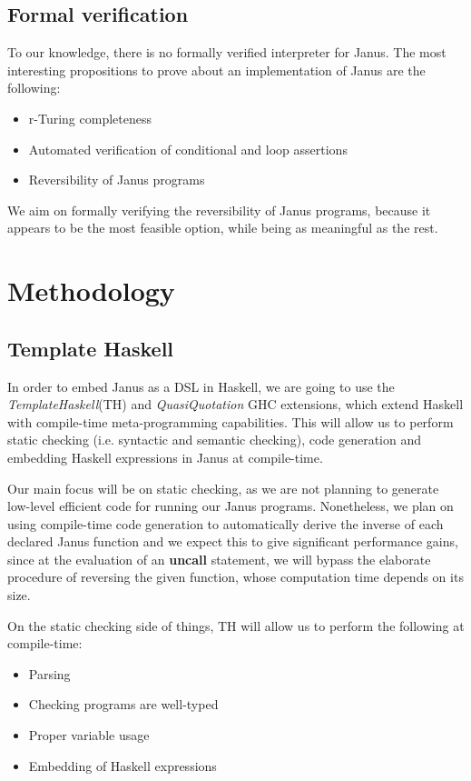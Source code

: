 \documentclass[12pt,a4paper]{article}
\begin{document}
\subsection{Formal verification}
To our knowledge, there is no formally verified interpreter for Janus. The most interesting propositions to prove about an implementation of Janus are the following:
\begin{itemize}
	\item r-Turing completeness
	\item Automated verification of conditional and loop assertions
	\item Reversibility of Janus programs
\end{itemize}
We aim on formally verifying the reversibility of Janus programs, because it appears to be the most feasible option, while being as meaningful as the rest.

\section{Methodology}
\subsection{Template Haskell}
In order to embed Janus as a DSL in Haskell, we are going to use the \textit{TemplateHaskell}(TH) and \textit{QuasiQuotation} GHC extensions, which extend Haskell with compile-time meta-programming capabilities. This will allow us to perform static checking (i.e. syntactic and semantic checking), code generation and embedding Haskell expressions in Janus at compile-time.

Our main focus will be on static checking, as we are not planning to generate low-level efficient code for running our Janus programs. Nonetheless, we plan on using compile-time code generation to automatically derive the inverse of each declared Janus function and we expect this to give significant performance gains, since at the evaluation of an \textbf{uncall} statement, we will bypass the elaborate procedure of reversing the given function, whose computation time depends on its size.

On the static checking side of things, TH will allow us to perform the following at compile-time:
\begin{itemize}
	\item{Parsing}
	\item{Checking programs are well-typed}
	\item{Proper variable usage}
	\item{Embedding of Haskell expressions}
\end{itemize}
\end{document}
